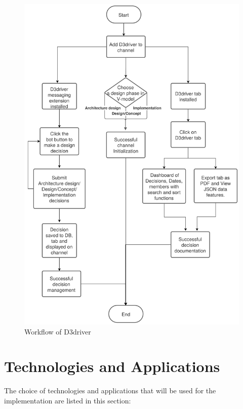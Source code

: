 \begin{figure}
\centering
\includegraphics[width=1\linewidth]{figures/d3dflowchartpng}
\caption{Workflow of D3driver}
\label{fig:d3dflowchartpng}
\end{figure}


\section{Technologies and Applications}

The choice of technologies and applications that will be used for the implementation are listed in this section:

